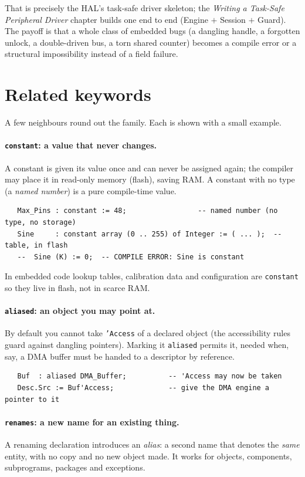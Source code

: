 That is precisely the HAL's task-safe driver skeleton; the \emph{Writing a
Task-Safe Peripheral Driver} chapter builds one end to end (Engine $+$ Session
$+$ Guard). The payoff is that a whole class of embedded bugs (a dangling
handle, a forgotten unlock, a double-driven bus, a torn shared counter) becomes
a compile error or a structural impossibility instead of a field failure.

\section{Related keywords}

A few neighbours round out the family. Each is shown with a small example.

\paragraph{\texttt{constant}: a value that never changes.} A constant is given
its value once and can never be assigned again; the compiler may place it in
read-only memory (flash), saving RAM. A constant with no type (a \emph{named
number}) is a pure compile-time value.

\begin{lstlisting}
   Max_Pins : constant := 48;                 -- named number (no type, no storage)
   Sine     : constant array (0 .. 255) of Integer := ( ... );  -- table, in flash
   --  Sine (K) := 0;  -- COMPILE ERROR: Sine is constant
\end{lstlisting}

In embedded code lookup tables, calibration data and configuration are
\texttt{constant} so they live in flash, not in scarce RAM.

\paragraph{\texttt{aliased}: an object you may point at.} By default you cannot
take \texttt{'Access} of a declared object (the accessibility rules guard against
dangling pointers). Marking it \texttt{aliased} permits it, needed when, say, a
DMA buffer must be handed to a descriptor by reference.

\begin{lstlisting}
   Buf  : aliased DMA_Buffer;          -- 'Access may now be taken
   Desc.Src := Buf'Access;             -- give the DMA engine a pointer to it
\end{lstlisting}

\paragraph{\texttt{renames}: a new name for an existing thing.} A renaming
declaration introduces an \emph{alias}: a second name that denotes the \emph{same}
entity, with no copy and no new object made. It works for objects, components,
subprograms, packages and exceptions.

